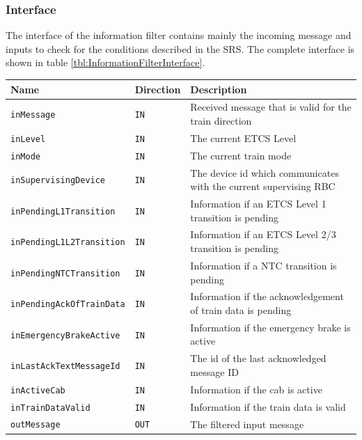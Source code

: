 \subsubsection{Interface}
The interface of the information filter contains mainly the incoming
message and inputs to check for the conditions described in the
SRS. The complete interface is shown in table \ref{tbl:InformationFilterInterface}.

\begin{minipage}{\linewidth}
  \scriptsize
  \begin{tabular}{| l | l | l |}
    \hline
    \textbf{Name}                    & \textbf{Direction} & \textbf{Description}                                        \\ 
    \hline
    \texttt{inMessage}               & \texttt{IN}        & Received message that is valid for the train direction      \\
    \texttt{inLevel}                 & \texttt{IN}        & The current ETCS Level                                      \\
    \texttt{inMode}                  & \texttt{IN}        & The current train mode                                      \\
    \texttt{inSupervisingDevice}     & \texttt{IN}        & The device id which communicates with the current supervising
  RBC                                                                                                                   \\
    \texttt{inPendingL1Transition}   & \texttt{IN}        & Information if an ETCS Level 1 transition is pending        \\
    \texttt{inPendingL1L2Transition} & \texttt{IN}        & Information if an ETCS Level 2/3 transition is pending      \\
    \texttt{inPendingNTCTransition}  & \texttt{IN}        & Information if a NTC transition is pending                  \\
    \texttt{inPendingAckOfTrainData} & \texttt{IN}        & Information if the acknowledgement of train data is pending \\
    \texttt{inEmergencyBrakeActive}  & \texttt{IN}        & Information if the emergency brake is active                \\
    \texttt{inLastAckTextMessageId}  & \texttt{IN}        & The id of the last acknowledged message ID                  \\
    \texttt{inActiveCab}             & \texttt{IN}        & Information if the cab is active                            \\
    \texttt{inTrainDataValid}        & \texttt{IN}        & Information if the train data is valid                      \\
    \texttt{outMessage}              & \texttt{OUT}       & The filtered input message                                  \\
    \hline
  \end{tabular}
  \label{tbl:InformationFilterInterface}
\end{minipage}

